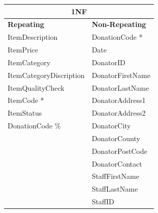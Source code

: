 \begin{center}
    \begin{tabular}{|p{4.5cm}|p{4.5cm}|}
	\hline
	\multicolumn{2}{|c|}{1NF} \\
	\hline
	\textbf{Repeating} & \textbf{Non-Repeating} \\ \hline
	{ItemDescription} & {DonationCode *} \\ \hline
	{ItemPrice} & {Date} \\ \hline
	{ItemCategory} & {DonatorID} \\ \hline
	{ItemCategoryDiscription} & {DonatorFirstName} \\ \hline
	{ItemQualityCheck} & {DonatorLastName} \\ \hline
	{ItemCode *} & {DonatorAddress1} \\ \hline
	{ItemStatus} & {DonatorAddress2} \\ \hline
	{DonationCode \%} & {DonatorCity} \\ \hline
	{} & {DonatorCounty} \\ \hline
	{} & {DonatorPostCode} \\ \hline
	{} & {DonatorContact} \\ \hline
	{} & {StaffFirstName} \\ \hline
	{} & {StaffLastName} \\ \hline
	{} & {StaffID} \\ \hline
    \end{tabular}
\end{center}


